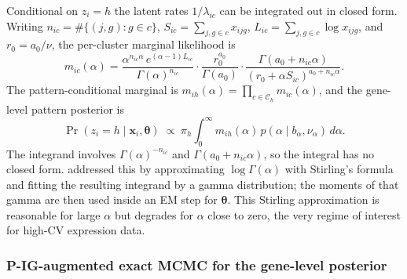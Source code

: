Conditional on $z_i = h$ the latent rates $1/\lambda_{ic}$ can be integrated
out in closed form. Writing $n_{ic} = \#\{(j,g) : g \in c\}$,
$S_{ic} = \sum_{j, g \in c} x_{ijg}$,
$L_{ic} = \sum_{j, g \in c} \log x_{ijg}$, and $r_0 = a_0/\nu$, the
per-cluster marginal likelihood is
\begin{equation}\label{eq:m.cluster}
m_{ic}(\alpha) = \frac{\alpha^{n_{ic}\alpha}\,e^{(\alpha-1)L_{ic}}}{\Gamma(\alpha)^{n_{ic}}}
\cdot \frac{r_0^{a_0}}{\Gamma(a_0)}
\cdot \frac{\Gamma(a_0 + n_{ic}\alpha)}{(r_0 + \alpha S_{ic})^{a_0 + n_{ic}\alpha}}.
\end{equation}
The pattern-conditional marginal is $m_{ih}(\alpha) = \prod_{c \in
\mathcal{C}_h} m_{ic}(\alpha)$, and the gene-level pattern posterior is
\begin{equation}\label{eq:pp.gene}
\Pr(z_i = h \mid \mathbf{x}_i, \boldsymbol\theta) \;\propto\;
   \pi_h \int_0^\infty m_{ih}(\alpha)\, p(\alpha \mid b_\alpha, \nu_\alpha)\, d\alpha.
\end{equation}
The integrand involves $\Gamma(\alpha)^{-n_{ic}}$ and
$\Gamma(a_0+n_{ic}\alpha)$, so the integral has no closed form.
\citet{Rossell2009GaGa} addressed this by approximating $\log\Gamma(\alpha)$
with Stirling's formula and fitting the resulting integrand by a gamma
distribution; the moments of that gamma are then used inside an EM step
for $\boldsymbol\theta$. This Stirling approximation is reasonable for
large $\alpha$ but degrades for $\alpha$ close to zero, the very regime
of interest for high-CV expression data.

\subsubsection{P-IG-augmented exact MCMC for the gene-level posterior}

